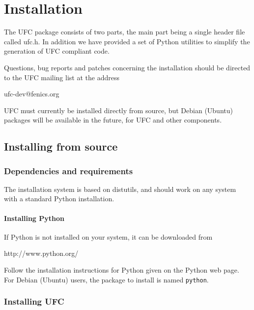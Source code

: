 \chapter{Installation}
\label{app:installation}

\newcommand{\ufc}{UFC}

The \ufc{} package consists of two parts, the main part being a single header file called ufc.h.
In addition we have provided a set of Python utilities to simplify the generation of \ufc{} compliant code.

Questions, bug reports and patches concerning
the installation should be directed to the
\ufc{} mailing list at the address
\begin{code}
ufc-dev@fenics.org
\end{code}

\ufc{} must currently be installed directly from source, but Debian
(Ubuntu) packages will be available in the future, for \ufc{} and
other \fenics{} components.


\section{Installing from source}

\subsection{Dependencies and requirements}

The installation system is based on distutils, and should work on any system with a standard Python installation.

\subsubsection{Installing Python}

If Python is not installed on your system, it can be downloaded from
\begin{code}
http://www.python.org/
\end{code}
Follow the installation instructions for Python given on the Python web page.
For Debian (Ubuntu) users, the package to install is named \texttt{python}.

\subsection{Installing \ufc{}}

